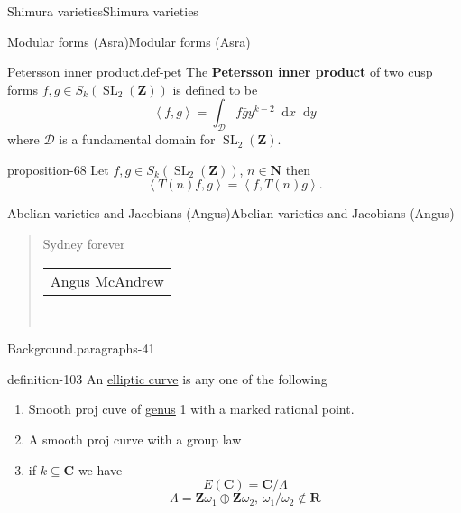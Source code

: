 \documentclass[10pt,]{book}
\newcommand{\terminology}[1]{\textbf{#1}}
\numberwithin{equation}{section}
\newcommand{\diff}{\mathop{}\!\mathrm{d}}
\newcommand{\pair}[2]{\left\langle #1, #2 \right\rangle}
\newcommand{\NN}{\mathbf{N}}
\newcommand{\ZZ}{\mathbf{Z}}
\newcommand{\RR}{\mathbf{R}}
\newcommand{\CC}{\mathbf{C}}
\DeclareMathOperator{\SL}{SL}
\begin{document}
\begin{chapterptx}{Shimura varieties}{}{Shimura varieties}{}{}
\begin{sectionptx}{Modular forms (Asra)}{}{Modular forms (Asra)}{}{}
\begin{definition}{Petersson inner product.}{def-pet}
\hypertarget{p-1087}{}%
The \terminology{Petersson inner product} of two \hyperref[def-buntes-cusp-forms]{cusp forms} \(f,g\in S_k(\SL_2(\ZZ))\) is defined to be%
\begin{equation*}
\pair{f}{g} = \int_{\mathcal D} f \bar g y^{k-2} \diff x \diff y
\end{equation*}
where \(\mathcal D\) is a fundamental domain for \(\SL_2(\ZZ)\).%
\end{definition}
\begin{proposition}{}{}{proposition-68}%
\hypertarget{p-1088}{}%
Let \(f,g\in S_k(\SL_2(\ZZ))\), \(n\in \NN\) then%
\begin{equation*}
\pair{T(n) f}{g} = \pair{f}{T(n)g}\text{.}
\end{equation*}
%
\end{proposition}
\end{sectionptx}
%
%
\typeout{************************************************}
\typeout{************************************************}
%
\begin{sectionptx}{Abelian varieties and Jacobians (Angus)}{}{Abelian varieties and Jacobians (Angus)}{}{}\label{sec-buntes-av-jac}
\begin{quote}\hypertarget{blockquote-2}{}
Sydney forever\par\hfill\begin{tabular}{l@{}}
\textemdash{}Angus McAndrew
\end{tabular}\\\par
\end{quote}
\begin{paragraphs}{Background.}{paragraphs-41}%
\begin{definition}{}{definition-103}%
\hypertarget{p-1089}{}%
An \hyperref[def-supersing-isog-ec]{elliptic curve} is any one of the following\leavevmode%
\begin{enumerate}
\item\hypertarget{li-270}{}Smooth proj cuve of \hyperref[def-class-set]{genus} 1 with  a marked rational point.%
\item\hypertarget{li-271}{}A smooth proj curve with a group law%
\item\hypertarget{li-272}{}if \(k \subseteq \CC\) we have%
\begin{equation*}
E(\CC) = \CC/ \Lambda
\end{equation*}
%
\begin{equation*}
\Lambda = \ZZ \omega_1 \oplus \ZZ \omega_2,\, \omega_1/\omega_2 \not\in \RR

\end{equation*}
\end{enumerate}
\end{definition}
\end{paragraphs}
\end{sectionptx}
\end{chapterptx}
\end{document}
